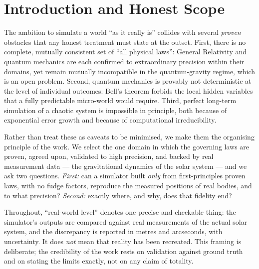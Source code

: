 \documentclass[11pt]{article}
\theoremstyle{definition}
\begin{document}
\section{Introduction and Honest Scope}

The ambition to simulate a world ``as it really is'' collides with several
\emph{proven} obstacles that any honest treatment must state at the outset.
First, there is no complete, mutually consistent set of ``all physical laws'':
General Relativity and quantum mechanics are each confirmed to extraordinary
precision within their domains, yet remain mutually incompatible in the
quantum-gravity regime, which is an open problem. Second, quantum mechanics is
provably not deterministic at the level of individual outcomes: Bell's theorem
\cite{bell1964} forbids the local hidden variables that a fully predictable
micro-world would require. Third, perfect long-term simulation of a chaotic
system is impossible in principle, both because of exponential error growth and
because of computational irreducibility.

Rather than treat these as caveats to be minimised, we make them the organising
principle of the work. We select the one domain in which the governing laws are
proven, agreed upon, validated to high precision, and backed by real
measurement data --- the gravitational dynamics of the solar system --- and we
ask two questions. \emph{First:} can a simulator built \emph{only} from
first-principles proven laws, with no fudge factors, reproduce the measured
positions of real bodies, and to what precision? \emph{Second:} exactly where,
and why, does that fidelity end?

Throughout, ``real-world level'' denotes one precise and checkable thing: the
simulator's outputs are compared against real measurements of the actual solar
system, and the discrepancy is reported in metres and arcseconds, with
uncertainty. It does \emph{not} mean that reality has been recreated. This
framing is deliberate; the credibility of the work rests on validation against
ground truth and on stating the limits exactly, not on any claim of totality.
\end{document}
